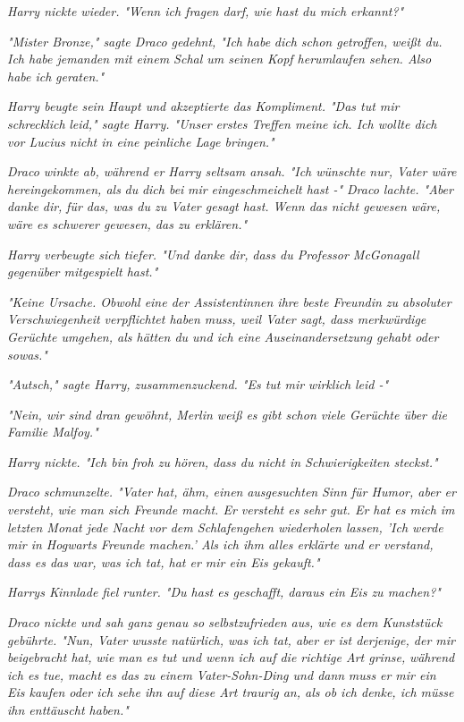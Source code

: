 {\emph{Harry nickte wieder. "Wenn ich fragen darf, wie hast du mich erkannt?"}

\emph{"\emph{Mister Bronze,}" sagte Draco gedehnt, "Ich} \emph{\emph{habe}} \emph{dich schon getroffen, weißt du. Ich habe jemanden mit einem Schal um seinen Kopf herumlaufen sehen. Also habe ich} \emph{\emph{geraten.}"}

\emph{Harry beugte sein Haupt und akzeptierte das Kompliment. "Das tut mir} \emph{\emph{schrecklich}} \emph{leid," sagte Harry. "Unser erstes Treffen meine ich. Ich wollte dich vor Lucius nicht in eine peinliche Lage bringen."}

\emph{Draco winkte ab, während er Harry seltsam ansah. "Ich wünschte nur, Vater wäre hereingekommen, als} \emph{\emph{du}} \emph{dich bei} \emph{\emph{mir}} \emph{eingeschmeichelt hast -" Draco lachte. "Aber danke} \emph{\emph{dir,}} \emph{für das, was du zu Vater gesagt hast. Wenn das nicht gewesen wäre, wäre es schwerer gewesen, das zu erklären."}

\emph{Harry verbeugte sich tiefer. "Und danke} \emph{\emph{dir,}} \emph{dass du Professor McGonagall gegenüber mitgespielt hast."}

\emph{"Keine Ursache. Obwohl eine der Assistentinnen ihre beste Freundin zu absoluter Verschwiegenheit verpflichtet haben muss, weil Vater sagt, dass merkwürdige Gerüchte umgehen, als hätten du und ich eine Auseinandersetzung gehabt oder sowas."}

\emph{"Autsch," sagte Harry, zusammenzuckend. "Es tut mir} \emph{\emph{wirklich}} \emph{leid -"}

\emph{"Nein, wir sind dran gewöhnt, Merlin weiß es gibt schon viele Gerüchte über die Familie Malfoy."}

\emph{Harry nickte. "Ich bin froh zu hören, dass du nicht in Schwierigkeiten steckst."}

\emph{Draco schmunzelte. "Vater hat, ähm, einen} \emph{\emph{ausgesuchten}} \emph{Sinn für Humor, aber er} \emph{\emph{versteht,}} \emph{wie man sich Freunde macht. Er versteht es} \emph{\emph{sehr}} \emph{gut. Er hat es mich im letzten Monat jede Nacht vor dem Schlafengehen wiederholen lassen, 'Ich werde mir in Hogwarts Freunde machen.' Als ich ihm alles erklärte und er verstand, dass es das war, was ich tat, hat er mir ein Eis gekauft."}

\emph{Harrys Kinnlade fiel runter. "\emph{Du hast es geschafft, daraus ein Eis zu machen?}"}

\emph{Draco nickte und sah ganz genau so selbstzufrieden aus, wie es dem Kunststück gebührte. "Nun, Vater} \emph{\emph{wusste}} \emph{natürlich, was ich tat, aber er ist derjenige, der mir beigebracht hat,} \emph{\emph{wie}} \emph{man es tut und wenn ich auf die richtige Art grinse,} \emph{\emph{während}} \emph{ich es tue, macht es das zu einem Vater-Sohn-Ding und dann} \emph{\emph{muss}} \emph{er mir ein Eis kaufen oder ich sehe ihn auf diese Art traurig an, als ob ich denke, ich müsse ihn enttäuscht haben."}

}

